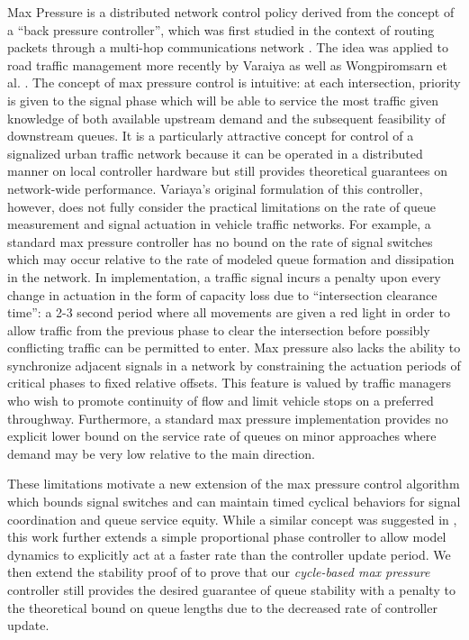 Max Pressure is a distributed network control policy derived from the concept of a ``back pressure controller'', which was first studied in the context of routing packets through a multi-hop communications network \cite{Tassiulas1992}. The idea was applied to road traffic management more recently by Varaiya \cite{Varaiya2013} as well as Wongpiromsarn et al. \cite{Wongpiromsarn2012}. The concept of max pressure control is intuitive: at each intersection, priority is given to the signal phase which will be able to service the most traffic given knowledge of both available upstream demand and the subsequent feasibility of downstream queues. It is a particularly attractive concept for control of a signalized urban traffic network because it can be operated in a distributed manner on local controller hardware but still provides theoretical guarantees on network-wide performance. Variaya's original formulation of this controller, however, does not fully consider the practical limitations on the rate of queue measurement and signal actuation in vehicle traffic networks. For example, a standard max pressure controller has no bound on the rate of signal switches which may occur relative to the rate of modeled queue formation and dissipation in the network. In implementation, a traffic signal incurs a penalty upon every change in actuation in the form of capacity loss due to ``intersection clearance time'': a 2-3 second period where all movements are given a red light in order to allow traffic from the previous phase to clear the intersection before possibly conflicting traffic can be permitted to enter. Max pressure also lacks the ability to synchronize adjacent signals in a network by constraining the actuation periods of critical phases to fixed relative offsets. This feature is valued by traffic managers who wish to promote continuity of flow and limit vehicle stops on a preferred throughway. Furthermore, a standard max pressure implementation provides no explicit lower bound on the service rate of queues on minor approaches where demand may be very low relative to the main direction. 

These limitations motivate a new extension of the max pressure control algorithm which bounds signal switches and can maintain timed cyclical behaviors for signal coordination and queue service equity. While a similar concept was suggested in \cite{Varaiya2013}, this work further extends a simple proportional phase controller to allow model dynamics to explicitly act at a faster rate than the controller update period. We then extend the stability proof of \cite{Varaiya2013} to prove that our \emph{cycle-based max pressure} controller still provides the desired guarantee of queue stability with a penalty to the theoretical bound on queue lengths due to the decreased rate of controller update.

